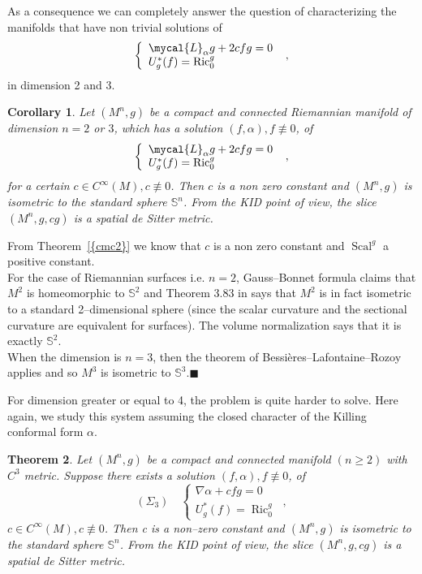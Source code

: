 \documentclass[a4paper,11pt,leqno]{amsart}
\numberwithin{equation}{section}
\theoremstyle{main}
\newtheorem{thm} {\bf  Theorem} [section]
\newtheorem{coro} [thm] {\bf  Corollary}
\begin{document}
As a consequence we can completely answer the question of characterizing the manifolds that have non trivial solutions of 
$$ \left\{
\begin{array}{l}
	 \mycal{L}_\alpha g+ 2cfg= 0 \\
	 U_g^* (f)={\operatorname{Ric}}^g_0
\end{array}\right. \ ,$$
in dimension 2  and 3.
\begin{coro}
Let  $(M^n, g)$ be a compact and connected Riemannian manifold of dimension $n=2$  or $3$, which has a solution $(f,\alpha), f\not\equiv0$, of
$$ \left\{
\begin{array}{l}
	 \mycal{L}_\alpha g+ 2cfg= 0 \\
	 U_g^* (f)={\operatorname{Ric}}^g_0
\end{array}\right. \ ,$$
for a certain $c\in C^{\infty}(M), c\not\equiv 0$. Then $c$ is a non zero constant and $(M^n,g)$ is isometric to the standard sphere $\mathbb S^n$. From the KID point of view, the slice $(M^n, g,  cg)$ is a spatial de Sitter metric.
\end{coro}
\proof From Theorem~{\ref{{cmc2}}} we know that $c$ is a non zero constant and ${\operatorname{Scal}}^g$ a positive constant.\\
For the case of Riemannian surfaces i.e. $n=2$, Gauss--Bonnet formula claims that $M^2$ is homeomorphic to $\mathbb S^2$ and Theorem 3.83 in \cite{GHL} says that $M^2$ is in fact isometric to a standard 2--dimensional sphere (since the scalar curvature and the sectional curvature are equivalent for surfaces). The volume  normalization says that it is exactly $\mathbb S^2$.\\
When the dimension is $n=3$, then the theorem of Bessières--Lafontaine--Rozoy applies and so $M^3$ is isometric to $\mathbb S^3$.{\hfill $\blacksquare$ \medskip \\}

For dimension greater or equal to 4, the problem is quite harder to solve. Here again, we study this system assuming the closed character of the Killing conformal form $\alpha$.

\begin{thm}\label{BLR}
Let $(M^n, g)$ be a compact and connected manifold $(n\ge 2)$ with $C^3$ metric. Suppose there exists a solution $(f,\alpha), f\not\equiv0$, of
$$(\Sigma_3)\quad \left\{
\begin{array}{l}
	 \nabla\alpha+ cfg= 0 \\
	 U_g^* (f)={\operatorname{Ric}}^g_0
\end{array}\right. \ ,$$
$c\in C^{\infty}(M), c\not\equiv 0$. Then c is a non--zero constant and $(M^n,g)$ is isometric to the standard sphere ${{\mathbb S^{n}}}$. From the KID point of view, the slice $(M^n, g,cg)$ is a spatial de Sitter metric.
\end{thm}
\end{document}
